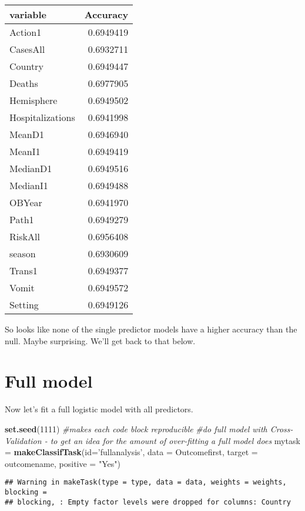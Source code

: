 \documentclass[]{article}
\newenvironment{Shaded}{\begin{snugshade}}{\end{snugshade}}
\newcommand{\CommentTok}[1]{\textcolor[rgb]{0.56,0.35,0.01}{\textit{#1}}}
\newcommand{\DataTypeTok}[1]{\textcolor[rgb]{0.13,0.29,0.53}{#1}}
\newcommand{\DecValTok}[1]{\textcolor[rgb]{0.00,0.00,0.81}{#1}}
\newcommand{\KeywordTok}[1]{\textcolor[rgb]{0.13,0.29,0.53}{\textbf{#1}}}
\newcommand{\NormalTok}[1]{#1}
\newcommand{\OperatorTok}[1]{\textcolor[rgb]{0.81,0.36,0.00}{\textbf{#1}}}
\newcommand{\OtherTok}[1]{\textcolor[rgb]{0.56,0.35,0.01}{#1}}
\newcommand{\StringTok}[1]{\textcolor[rgb]{0.31,0.60,0.02}{#1}}
\begin{document}
\begin{longtable}[]{@{}lr@{}}
\toprule
variable & Accuracy\tabularnewline
\midrule
\endhead
Action1 & 0.6949419\tabularnewline
CasesAll & 0.6932711\tabularnewline
Country & 0.6949447\tabularnewline
Deaths & 0.6977905\tabularnewline
Hemisphere & 0.6949502\tabularnewline
Hospitalizations & 0.6941998\tabularnewline
MeanD1 & 0.6946940\tabularnewline
MeanI1 & 0.6949419\tabularnewline
MedianD1 & 0.6949516\tabularnewline
MedianI1 & 0.6949488\tabularnewline
OBYear & 0.6941970\tabularnewline
Path1 & 0.6949279\tabularnewline
RiskAll & 0.6956408\tabularnewline
season & 0.6930609\tabularnewline
Trans1 & 0.6949377\tabularnewline
Vomit & 0.6949572\tabularnewline
Setting & 0.6949126\tabularnewline
\bottomrule
\end{longtable}

So looks like none of the single predictor models have a higher accuracy
than the null. Maybe surprising. We'll get back to that below.

\hypertarget{full-model}{%
\section{Full model}\label{full-model}}

Now let's fit a full logistic model with all predictors.

\begin{Shaded}
\begin{Highlighting}[]
\KeywordTok{set.seed}\NormalTok{(}\DecValTok{1111}\NormalTok{) }\CommentTok{#makes each code block reproducible}
\CommentTok{#do full model with Cross-Validation - to get an idea for the amount of over-fitting a full model does}
\NormalTok{mytask =}\StringTok{ }\KeywordTok{makeClassifTask}\NormalTok{(}\DataTypeTok{id=}\StringTok{'fullanalysis'}\NormalTok{, }\DataTypeTok{data =}\NormalTok{ Outcomefirst, }\DataTypeTok{target =}\NormalTok{ outcomename, }\DataTypeTok{positive =} \StringTok{"Yes"}\NormalTok{)}
\end{Highlighting}
\end{Shaded}

\begin{verbatim}
## Warning in makeTask(type = type, data = data, weights = weights, blocking =
## blocking, : Empty factor levels were dropped for columns: Country
\end{verbatim}

\begin{Shaded}
\end{Shaded}
\end{document}
